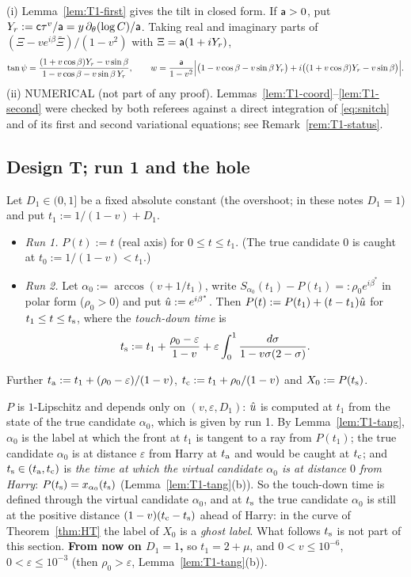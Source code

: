 \begin{remark}\label{rem:T1-tilt}
(i) Lemma~\ref{lem:T1-first} gives the tilt in closed form. If $\mathsf a>0$, put $Y_r:=\mathsf c\tau^v/\mathsf a=y\,\partial_\theta(\log C)/\mathsf a$. Taking
real and imaginary parts of $(\Xi-ve^{i\beta}\bar\Xi)/(1-v^2)$ with $\Xi=\mathsf a(1+iY_r)$,
\[
\tan\psi=\frac{(1+v\cos\beta)Y_r-v\sin\beta}{1-v\cos\beta-v\sin\beta\,Y_r},\qquad
w=\frac{\mathsf a}{1-v^2}\Bigl|\bigl(1-v\cos\beta-v\sin\beta\,Y_r\bigr)+i\bigl((1+v\cos\beta)Y_r-v\sin\beta\bigr)\Bigr| .
\]
(ii) NUMERICAL (not part of any proof). Lemmas~\ref{lem:T1-coord}--\ref{lem:T1-second} were checked by both referees against a direct
integration of \eqref{eq:snitch} and of its first and second variational equations; see Remark~\ref{rem:T1-status}.
\end{remark}

\subsection{Design T; run 1 and the hole}\label{sec:T1-run1}

\begin{TDdefinition}[Design T]\label{def:T}
Let $D_1\in(0,1]$ be a fixed absolute constant (the overshoot; in these notes $D_1=1$) and put $t_1:=1/(1-v)+D_1$.
\begin{itemize}
\item \emph{Run 1.} $P(t):=t$ (real axis) for $0\le t\le t_1$. (The true candidate $0$ is caught at $t_0:=1/(1-v)<t_1$.)
\item \emph{Run 2.} Let $\alpha_0:=\arccos(v+1/t_1)$, write $S_{\alpha_0}(t_1)-P(t_1)=:\rho_0e^{i\beta^*}$ in polar form ($\rho_0>0$) and put
$\hat u:=e^{i\beta^*}$. Then $P(t):=P(t_1)+(t-t_1)\hat u$ for $t_1\le t\le t_{\mathrm s}$, where the \emph{touch-down time} is
\[
t_{\mathrm s}:=t_1+\frac{\rho_0-\varepsilon}{1-v}+\varepsilon\int_0^1\frac{d\sigma}{1-v\sigma(2-\sigma)} .
\]
\end{itemize}
Further $t_{\mathrm a}:=t_1+(\rho_0-\varepsilon)/(1-v)$, $t_{\mathrm c}:=t_1+\rho_0/(1-v)$ and $X_0:=P(t_{\mathrm s})$.
\end{TDdefinition}
$P$ is $1$-Lipschitz and depends only on $(v,\varepsilon,D_1)$: $\hat u$ is computed at $t_1$ from the state of the true candidate
$\alpha_0$, which is given by run 1. By Lemma~\ref{lem:T1-tang}, $\alpha_0$ is the label at which the front at $t_1$ is tangent to a ray
from $P(t_1)$; the true candidate $\alpha_0$ is at distance $\varepsilon$ from Harry at $t_{\mathrm a}$ and would be caught at $t_{\mathrm c}$; and
$t_{\mathrm s}\in(t_{\mathrm a},t_{\mathrm c})$ is \emph{the time at which the virtual candidate $\alpha_0$ is at distance $0$ from Harry}:
$P(t_{\mathrm s})=x_{\alpha_0}(t_{\mathrm s})$ (Lemma~\ref{lem:T1-tang}(b)). So the touch-down time is defined through the virtual candidate $\alpha_0$, and
at $t_{\mathrm s}$ the true candidate $\alpha_0$ is still at the positive distance $(1-v)(t_{\mathrm c}-t_{\mathrm s})$ ahead of Harry: in the curve of
Theorem~\ref{thm:HT} the label of $X_0$ is a \emph{ghost label}. What follows $t_{\mathrm s}$ is not part of this section. \textbf{From now on
$D_1=1$,} so $t_1=2+\mu$, and $0<v\le10^{-6}$, $0<\varepsilon\le10^{-3}$ (then $\rho_0>\varepsilon$, Lemma~\ref{lem:T1-tang}(b)).


